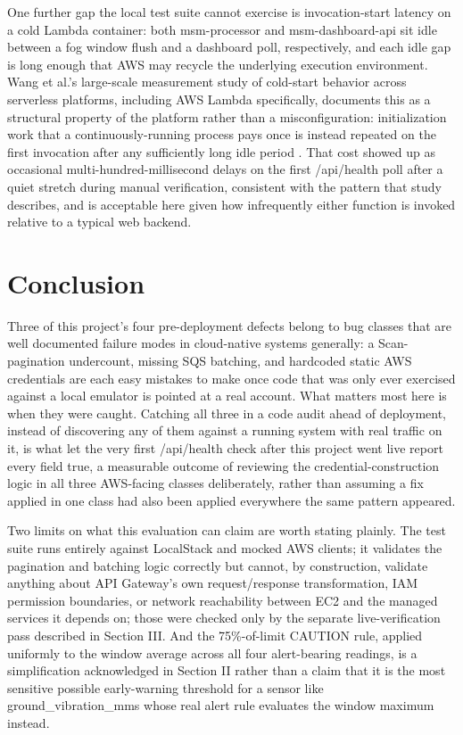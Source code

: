 \documentclass[conference]{IEEEtran}
\begin{document}
One further gap the local test suite cannot exercise is invocation-start latency on a cold Lambda container: both msm-processor and msm-dashboard-api sit idle between a fog window flush and a dashboard poll, respectively, and each idle gap is long enough that AWS may recycle the underlying execution environment. Wang et al.'s large-scale measurement study of cold-start behavior across serverless platforms, including AWS Lambda specifically, documents this as a structural property of the platform rather than a misconfiguration: initialization work that a continuously-running process pays once is instead repeated on the first invocation after any sufficiently long idle period \cite{ref8}. That cost showed up as occasional multi-hundred-millisecond delays on the first /api/health poll after a quiet stretch during manual verification, consistent with the pattern that study describes, and is acceptable here given how infrequently either function is invoked relative to a typical web backend.

\section{Conclusion}

Three of this project's four pre-deployment defects belong to bug classes that are well documented failure modes in cloud-native systems generally: a Scan-pagination undercount, missing SQS batching, and hardcoded static AWS credentials are each easy mistakes to make once code that was only ever exercised against a local emulator is pointed at a real account. What matters most here is when they were caught. Catching all three in a code audit ahead of deployment, instead of discovering any of them against a running system with real traffic on it, is what let the very first /api/health check after this project went live report every field true, a measurable outcome of reviewing the credential-construction logic in all three AWS-facing classes deliberately, rather than assuming a fix applied in one class had also been applied everywhere the same pattern appeared.

Two limits on what this evaluation can claim are worth stating plainly. The test suite runs entirely against LocalStack and mocked AWS clients; it validates the pagination and batching logic correctly but cannot, by construction, validate anything about API Gateway's own request/response transformation, IAM permission boundaries, or network reachability between EC2 and the managed services it depends on; those were checked only by the separate live-verification pass described in Section III. And the 75\%-of-limit CAUTION rule, applied uniformly to the window average across all four alert-bearing readings, is a simplification acknowledged in Section II rather than a claim that it is the most sensitive possible early-warning threshold for a sensor like ground\_vibration\_mms whose real alert rule evaluates the window maximum instead.
\end{document}
